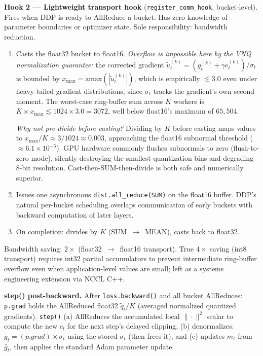 \documentclass[10pt,twocolumn]{article}
\begin{document}
\textbf{Hook 2 — Lightweight transport hook}
(\texttt{register\_comm\_hook}, bucket-level).
Fires when DDP is ready to AllReduce a bucket.  Has zero knowledge of
parameter boundaries or optimizer state.  Sole responsibility: bandwidth
reduction.
\begin{enumerate}[label=(\arabic*)]
  \item Casts the float32 bucket to float16.
    \emph{Overflow is impossible here by the VNQ normalization guarantee:}
    the corrected gradient $\tilde{u}_t^{(k)} = (g_t^{(k)} + \gamma e_t^{(k)})
    / \sigma_t$ is bounded by $x_{\max} = \mathrm{amax}(|\tilde{u}_t^{(k)}|)$,
    which is empirically $\lesssim 3.0$ even under heavy-tailed gradient
    distributions, since $\sigma_t$ tracks the gradient's own second moment.
    The worst-case ring-buffer sum across $K$ workers is $K \times x_{\max}
    \lesssim 1024 \times 3.0 = 3072$, well below float16's maximum of
    $65{,}504$.

    \emph{Why not pre-divide before casting?}  Dividing by $K$ before casting
    maps values to $x_{\max}/K \approx 3/1024 \approx 0.003$, approaching the
    float16 subnormal threshold (${\approx}6.1\times10^{-5}$).  GPU hardware
    commonly flushes subnormals to zero (flush-to-zero mode), silently
    destroying the smallest quantization bins and degrading 8-bit resolution.
    Cast-then-SUM-then-divide is both safe and numerically superior.
  \item Issues one asynchronous \texttt{dist.all\_reduce(SUM)} on the float16
    buffer.  DDP's natural per-bucket scheduling overlaps communication of
    early buckets with backward computation of later layers.
  \item On completion: divides by $K$ (SUM~$\to$~MEAN), casts back to float32.
\end{enumerate}
Bandwidth saving: $2\times$ (float32~$\to$~float16 transport).
True $4\times$ saving (int8 transport) requires int32 partial accumulators
to prevent intermediate ring-buffer overflow even when application-level
values are small; left as a systems engineering extension via NCCL C++.

\textbf{step() post-backward.}
After \texttt{loss.backward()} and all bucket AllReduces:
\texttt{p.grad} holds the AllReduced float32 $\tilde{q}_t / K$ (averaged
normalized quantized gradients).  \texttt{step()} (a) AllReduces the
accumulated local $\|\cdot\|^2$ scalar to compute the new $c_t$ for the next
step's delayed clipping, (b) denormalizes: $\bar{g}_t = (p.\mathit{grad}) \times
\sigma_t$ using the stored $\sigma_t$ (then frees it), and (c) updates $m_t$
from $\bar{g}_t$, then applies the standard Adam parameter update.
\end{document}
